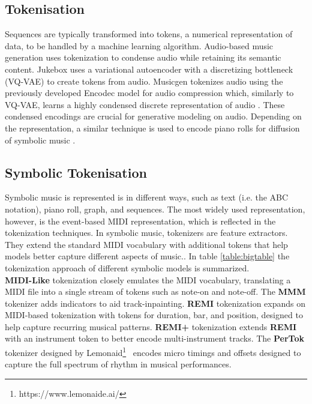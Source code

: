 \subsection{Tokenisation}\label{section:tokenization}
Sequences are typically transformed into tokens, a numerical representation of data, to be handled by a machine learning algorithm. Audio-based music generation uses tokenization to condense audio while retaining its semantic content. Jukebox \cite{Dhariwal_Jun_Payne_Kim_Radford_Sutskever_2020} uses a variational autoencoder\cite{Kingma_Welling_2014} with a discretizing bottleneck (VQ-VAE) to create tokens from audio. Musicgen \cite{copet2023simple} tokenizes audio using the previously developed Encodec model for audio compression which, similarly to VQ-VAE, learns a highly condensed discrete representation of audio \cite{Défossez_2023_encodec}. These condensed encodings are crucial for generative modeling on audio. Depending on the representation, a similar technique is used to encode piano rolls for diffusion of symbolic music \cite{Min_Jiang_Xia_Zhao_polyffusion_2023}\cite{Zhu_Liu_Jiang_Zheng_texture_2024}.

\subsection{Symbolic Tokenisation} \label{section:symbolic_tok}
Symbolic music is represented is in different ways, such as text (i.e. the ABC notation), piano roll, graph, and sequences. The most widely used representation, however, is the event-based MIDI representation, which is reflected in the tokenization techniques. In symbolic music, tokenizers are feature extractors. They extend the standard MIDI vocabulary with additional tokens that help models better capture different aspects of music.\cite{Fradet_Briot_Chhel_2021}. In table \ref{table:bigtable} the tokenization approach of different symbolic models is summarized.\\
\textbf{MIDI-Like} tokenization closely emulates the MIDI vocabulary, translating a MIDI file into a single stream of tokens such as note-on and note-off. The \textbf{MMM} tokenizer adds indicators to aid track-inpainting. \textbf{REMI} \cite{Huang_Yang_remi_pop_transformer_2020} tokenization expands on MIDI-based tokenization with tokens for duration, bar, and position, designed to help capture recurring musical patterns. \textbf{REMI+} \cite{Rütte_figaro_2023} tokenization extends \textbf{REMI} with an instrument token to better encode multi-instrument tracks. The \textbf{PerTok} tokenizer designed by Lemonaid\footnote{https://www.lemonaide.ai/}  encodes micro timings and offsets designed to capture the full spectrum of rhythm in musical performances.\\

